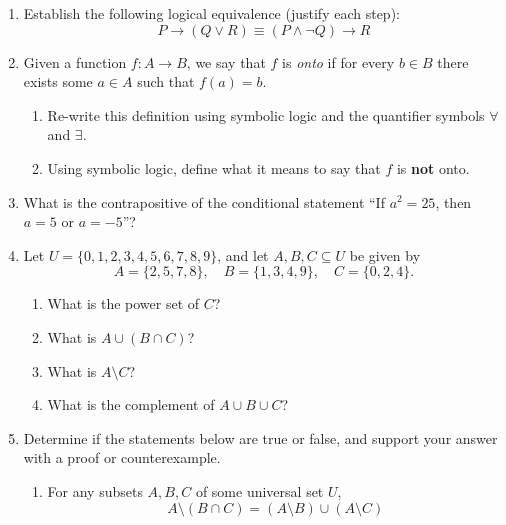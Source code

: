 \documentclass[12pt]{article}
\newcommand{\points}[1]{\marginpar{\hspace{24pt}[#1]}}
\begin{document}
\begin{enumerate}
\item Establish the following logical equivalence (justify each step):\points{5}
\[
 P\to (Q\vee R)\equiv (P\wedge \neg Q)\to R 
\]

\vspace{2.25in}

\item Given a function $f:A\to B$, we say that $f$ is {\em onto} if for every $b\in B$ there exists some $a\in A$ such that $f(a)=b$.
\begin{enumerate}
 \item Re-write this definition using symbolic logic and the quantifier symbols $\forall$ and $\exists$. \points{2}

\vspace{1.25in}

 \item Using symbolic logic, define what it means to say that $f$ is {\bf not} onto. \points{3}

\vspace{1.25in}
\end{enumerate}
\item What is the contrapositive of the conditional statement ``If $a^2=25$, then $a=5$ or $a=-5$''?\points{3}

\newpage

\item Let $U = \{0,1,2,3,4,5,6,7,8,9\}$, and let $A,B,C\subseteq U$ be given by
\[
 A = \{2,5,7,8\}, \quad B = \{1,3,4,9\}, \quad C = \{0,2,4\}.
\]
\begin{enumerate}
 \item What is the power set of $C$? \points{2}

\vspace{2in}

 \item What is $A\cup (B\cap C)$? \points{2}

\vspace{1.5in}

 \item What is $A\setminus C$? \points{2}

\vspace{1.5in}

 \item What is the complement of $A\cup B\cup C$? \points{2}
\end{enumerate}
\newpage

\item Determine if the statements below are true or false, and support your answer with a proof or counterexample.
\begin{enumerate}
 \item For any subsets $A,B,C$ of some universal set $U$,  \points{4}
\[
 A\setminus (B\cap C) = (A\setminus B)\cup (A\setminus C)
\]


\end{enumerate}
\end{enumerate}
\end{document}
